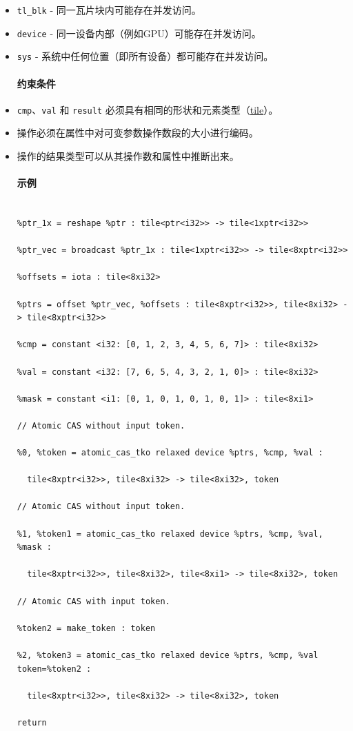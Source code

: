 \documentclass{article}
\begin{document}
\begin{itemize}
\item \texttt{tl\_blk} - 同一瓦片块内可能存在并发访问。
\item \texttt{device} - 同一设备内部（例如GPU）可能存在并发访问。
\item \texttt{sys} - 系统中任何位置（即所有设备）都可能存在并发访问。




\paragraph{约束条件}


\item \texttt{cmp}、\texttt{val} 和 \texttt{result} 必须具有相同的形状和元素类型（\href{https://docs.nvidia.com/cuda/tile-ir/latest/sections/types.html#type-tile}{tile}）。
\item 操作必须在属性中对可变参数操作数段的大小进行编码。
\item 操作的结果类型可以从其操作数和属性中推断出来。




\paragraph{示例}


\begin{lstlisting}

%ptr_1x = reshape %ptr : tile<ptr<i32>> -> tile<1xptr<i32>>

%ptr_vec = broadcast %ptr_1x : tile<1xptr<i32>> -> tile<8xptr<i32>>

%offsets = iota : tile<8xi32>

%ptrs = offset %ptr_vec, %offsets : tile<8xptr<i32>>, tile<8xi32> -> tile<8xptr<i32>>

%cmp = constant <i32: [0, 1, 2, 3, 4, 5, 6, 7]> : tile<8xi32>

%val = constant <i32: [7, 6, 5, 4, 3, 2, 1, 0]> : tile<8xi32>

%mask = constant <i1: [0, 1, 0, 1, 0, 1, 0, 1]> : tile<8xi1>

// Atomic CAS without input token.

%0, %token = atomic_cas_tko relaxed device %ptrs, %cmp, %val :

  tile<8xptr<i32>>, tile<8xi32> -> tile<8xi32>, token

// Atomic CAS without input token.

%1, %token1 = atomic_cas_tko relaxed device %ptrs, %cmp, %val, %mask :

  tile<8xptr<i32>>, tile<8xi32>, tile<8xi1> -> tile<8xi32>, token

// Atomic CAS with input token.

%token2 = make_token : token

%2, %token3 = atomic_cas_tko relaxed device %ptrs, %cmp, %val token=%token2 :

  tile<8xptr<i32>>, tile<8xi32> -> tile<8xi32>, token

return

\end{lstlisting}



\end{itemize}
\end{document}

